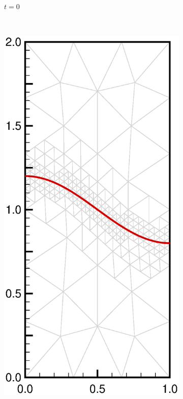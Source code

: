 \documentclass[11pt,a4paper,twoside]{article}
\begin{document}
\begin{figure}[ht!]
\begin{center}
\begin{subfigure}[]{0.2\textwidth}
				\caption{$ t = 0 $}
			\end{subfigure}
			~
			\begin{subfigure}[]{0.2\textwidth}
				\includegraphics[width=\textwidth]{SW_N5_L3_1.eps}

\end{subfigure}
\end{center}
\end{figure}
\end{document}
